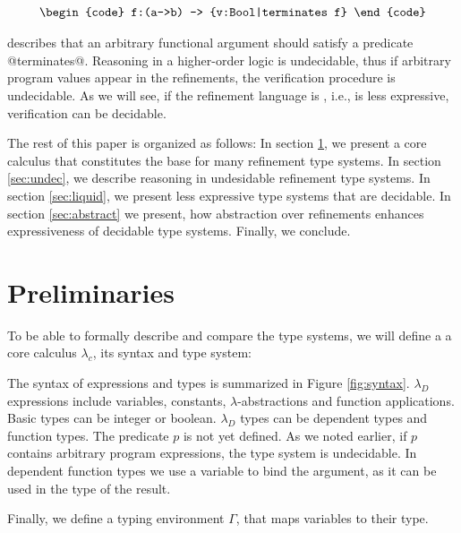 $$\centering\begin{tabular}{c}\begin{code}
f:(a->b) -> {v:Bool|terminates f}
\end{code}\end{tabular}$$

describes that an arbitrary functional argument
should satisfy a predicate @terminates@.
%
Reasoning in a higher-order logic is undecidable, 
thus if arbitrary program values appear in the refinements,
the verification procedure is undecidable.
%
As we will see, 
if the refinement language is , i.e., is less expressive,
verification can be decidable.

The rest of this paper is organized as follows:
In section \ref{subsec:formal}, we present a core calculus
that constitutes the base for many refinement type systems.
In section \ref{sec:undec},
we describe reasoning in undesidable refinement type systems.
In section \ref{sec:liquid}, 
we present less expressive type systems
that are decidable.
In section \ref{sec:abstract} 
we present, how abstraction over refinements
enhances expressiveness of decidable type systems. 
Finally, we conclude.

\section{Preliminaries}\label{subsec:formal}

To be able to formally describe and compare the type systems, 
we will define a a core calculus $\lambda_c$, its syntax and type system:

The syntax of expressions and types is summarized in Figure \ref{fig:syntax}.
$\lambda_D$ expressions include variables, constants, $\lambda$-abstractions
and function applications. 
Basic types can be integer or boolean.
$\lambda_D$ types can be dependent types and function types.
The predicate $p$ is
not yet defined. As we noted earlier, if $p$ contains arbitrary program 
expressions, the type system is undecidable.
In dependent function types we use a variable to bind the argument, 
as it can be used in the type of the result.

Finally, we define a typing environment $\Gamma$, that maps variables to their type.


